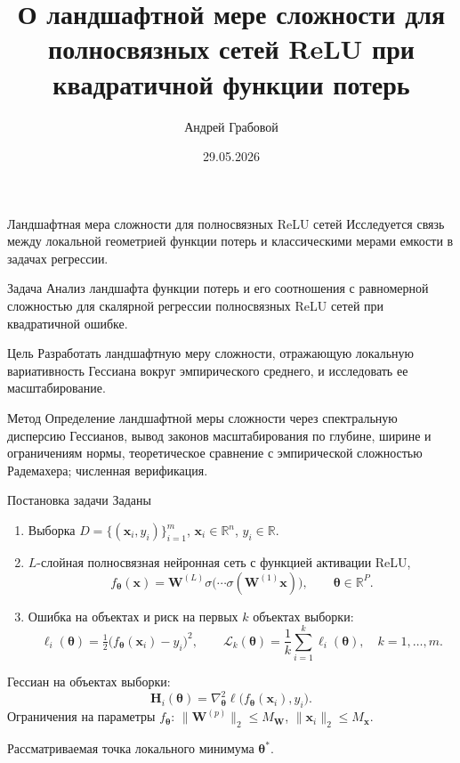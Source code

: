 \documentclass[10pt,pdf,hyperref={unicode}]{beamer}
\title[Ландшафтная мера сложности]{%
О ландшафтной мере сложности для полносвязных сетей ReLU при квадратичной функции потерь}
\author{%
    Андрей Грабовой}
\institute[ИПУ РАН]{%
Институт Проблем Управления РАН им. Трапезникова\\
grabovoy@ipu.ru}
\date{29.05.2026}
\begin{document}
\begin{frame}
\titlepage
\end{frame}

\begin{frame}{Ландшафтная мера сложности для полносвязных ReLU сетей}
\justifying
Исследуется связь между локальной геометрией функции потерь и классическими мерами емкости в задачах регрессии.

\begin{block}{Задача}
\justifying
Анализ ландшафта функции потерь и его соотношения с равномерной сложностью для скалярной регрессии полносвязных ReLU сетей при квадратичной ошибке.
\end{block}

\begin{block}{Цель}
\justifying
Разработать ландшафтную меру сложности, отражающую локальную вариативность Гессиана вокруг эмпирического среднего, и исследовать ее масштабирование.
\end{block}

\begin{block}{Метод}
\justifying
Определение ландшафтной меры сложности через спектральную дисперсию Гессианов, вывод законов масштабирования по глубине, ширине и ограничениям нормы, теоретическое сравнение с эмпирической сложностью Радемахера; численная верификация.
\end{block}
\end{frame}

\begin{frame}{Постановка задачи}
\justifying
Заданы
\begin{enumerate}[1)]
    \item Выборка $D=\{(\mathbf{x}_i,y_i)\}_{i=1}^{m}$, $\mathbf{x}_i\in\mathbb{R}^n$, $y_i\in\mathbb{R}.$
    \item $L$-слойная полносвязная нейронная сеть с функцией активации ReLU,
    \[
        f_{\boldsymbol{\theta}}(\mathbf{x})=\mathbf{W}^{(L)}\sigma\bigl(\cdots\sigma(\mathbf{W}^{(1)}\mathbf{x})\bigr),
        \qquad \boldsymbol{\theta}\in\mathbb{R}^P.
    \]
    \item Ошибка на объектах и риск на первых $k$ объектах выборки:
    \[
        \ell_i(\boldsymbol{\theta})
        = \tfrac{1}{2}\bigl(f_{\boldsymbol{\theta}}(\mathbf{x}_i)-y_i\bigr)^2,
        \qquad
        \mathcal{L}_k(\boldsymbol{\theta})
        = \frac{1}{k}\sum_{i=1}^{k}\ell_i(\boldsymbol{\theta}),
        \quad k=1,\ldots,m .
    \]
\end{enumerate}
Гессиан на объектах выборки:
\[
    \mathbf{H}_i(\boldsymbol{\theta})
    =\nabla^2_{\boldsymbol{\theta}}\ell\bigl(f_{\boldsymbol{\theta}}(\mathbf{x}_i),y_i\bigr).
\]
Ограничения на параметры $f_{\boldsymbol{\theta}}$: $\|\mathbf{W}^{(p)}\|_2\le M_{\mathbf{W}}$, $\|\mathbf{x}_i\|_2\le M_{\mathbf{x}}$.

Рассматриваемая точка локального минимума $\boldsymbol{\theta}^*$.
\end{frame}
\end{document}
